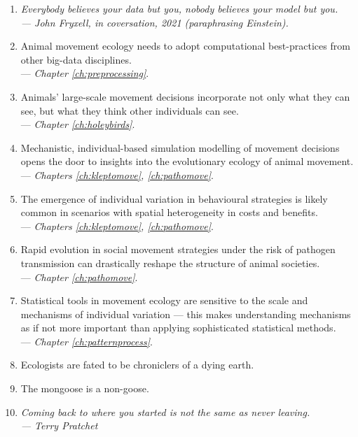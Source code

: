 \begin{onehalfspace}
    \begin{enumerate}
        \item \textit{Everybody believes your data but you, nobody believes your model but you.\\ --- John Fryxell, in coversation, 2021 (paraphrasing Einstein).}

        \item Animal movement ecology needs to adopt computational best-practices from other big-data disciplines.\\ --- \textit{Chapter \ref{ch:preprocessing}}.

        \item Animals' large-scale movement decisions incorporate not only what they can see, but what they think other individuals can see.\\ --- \textit{Chapter \ref{ch:holeybirds}}.

        \item Mechanistic, individual-based simulation modelling of movement decisions opens the door to insights into the evolutionary ecology of animal movement. \\ --- \textit{Chapters \ref{ch:kleptomove}, \ref{ch:pathomove}}.
        
        \item The emergence of individual variation in behavioural strategies is likely common in scenarios with spatial heterogeneity in costs and benefits.\\ --- \textit{Chapters \ref{ch:kleptomove}, \ref{ch:pathomove}}.

        \item Rapid evolution in social movement strategies under the risk of pathogen transmission can drastically reshape the structure of animal societies.\\ --- \textit{Chapter \ref{ch:pathomove}}.
        
        \item Statistical tools in movement ecology are sensitive to the scale and mechanisms of individual variation --- this makes understanding mechanisms as if not more important than applying sophisticated statistical methods.\\ --- \textit{Chapter \ref{ch:patternprocess}}.
        
        \item Ecologists are fated to be chroniclers of a dying earth.
        
        \item The mongoose is a non-goose.

        \item \textit{Coming back to where you started is not the same as never leaving.\\--- Terry Pratchet}
    \end{enumerate}

\end{onehalfspace}

{ \begin{center}  \end{center} }

\endgroup

\vfill

\clearpage
